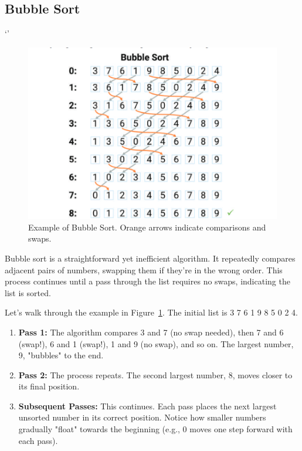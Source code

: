 \documentclass[12pt, a4paper]{article}
\begin{document}
\subsection{Bubble Sort}
`'
\begin{figure}[h]
    \centering
    \includegraphics[width=\textwidth]{images/bubble_sort_example.png}
    \caption{Example of Bubble Sort. Orange arrows indicate comparisons and swaps.}
    \label{fig:bubble_sort}
\end{figure}

Bubble sort is a straightforward yet inefficient algorithm. It repeatedly compares adjacent pairs of numbers, swapping them if they're in the wrong order. This process continues until a pass through the list requires no swaps, indicating the list is sorted.

Let's walk through the example in Figure~\ref{fig:bubble_sort}.  The initial list is 3 7 6 1 9 8 5 0 2 4.

\begin{enumerate}
    \item \textbf{Pass 1:}  The algorithm compares 3 and 7 (no swap needed), then 7 and 6 (swap!), 6 and 1 (swap!), 1 and 9 (no swap), and so on.  The largest number, 9, "bubbles" to the end.
    \item \textbf{Pass 2:}  The process repeats.  The second largest number, 8, moves closer to its final position.
    \item \textbf{Subsequent Passes:} This continues.  Each pass places the next largest unsorted number in its correct position.  Notice how smaller numbers gradually "float" towards the beginning (e.g., 0 moves one step forward with each pass).
\end{enumerate}
\end{document}
